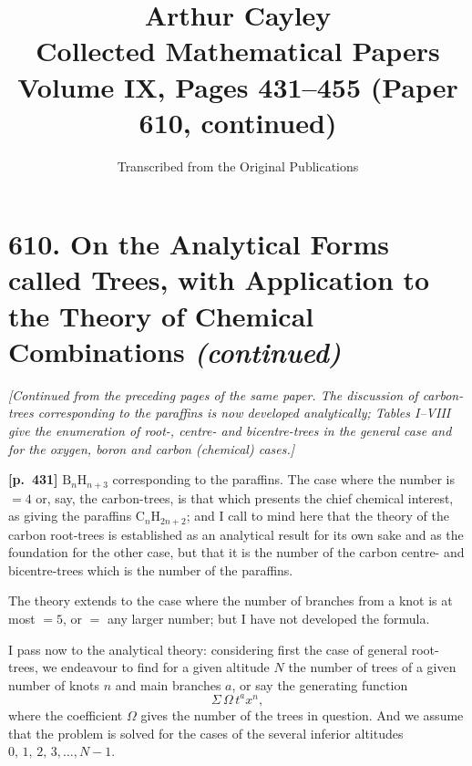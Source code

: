 \documentclass[11pt,a4paper]{article}
\title{\textbf{Arthur Cayley}\\\vspace{0.5em}
\Large Collected Mathematical Papers\\\vspace{0.3em}
\large Volume IX, Pages 431--455 (Paper 610, continued)}
\author{Transcribed from the Original Publications}
\date{}
\begin{document}
\maketitle
\thispagestyle{empty}

\tableofcontents
\newpage

\section*{\textbf{610.} On the Analytical Forms called Trees, with Application to the Theory of Chemical Combinations \textit{(continued)}}

\textit{[Continued from the preceding pages of the same paper. The discussion of carbon-trees corresponding to the paraffins is now developed analytically; Tables I--VIII give the enumeration of root-, centre- and bicentre-trees in the general case and for the oxygen, boron and carbon (chemical) cases.]}

\bigskip

\noindent\textbf{[p.~431]}\quad
$\mathrm{B}_n\mathrm{H}_{n+3}$ corresponding to the paraffins. The case where the number is $=4$ or, say, the carbon-trees, is that which presents the chief chemical interest, as giving the paraffins $\mathrm{C}_n\mathrm{H}_{2n+2}$; and I call to mind here that the theory of the carbon root-trees is established as an analytical result for its own sake and as the foundation for the other case, but that it is the number of the carbon centre- and bicentre-trees which is the number of the paraffins.

The theory extends to the case where the number of branches from a knot is at most $=5$, or $=$ any larger number; but I have not developed the formula.

I pass now to the analytical theory: considering first the case of general root-trees, we endeavour to find for a given altitude $N$ the number of trees of a given number of knots $n$ and main branches $a$, or say the generating function
\[
\Sigma\,\Omega\,t^{a} x^{n},
\]
where the coefficient $\Omega$ gives the number of the trees in question. And we assume that the problem is solved for the cases of the several inferior altitudes $0,\,1,\,2,\,3,\ldots,N-1$.
\end{document}
